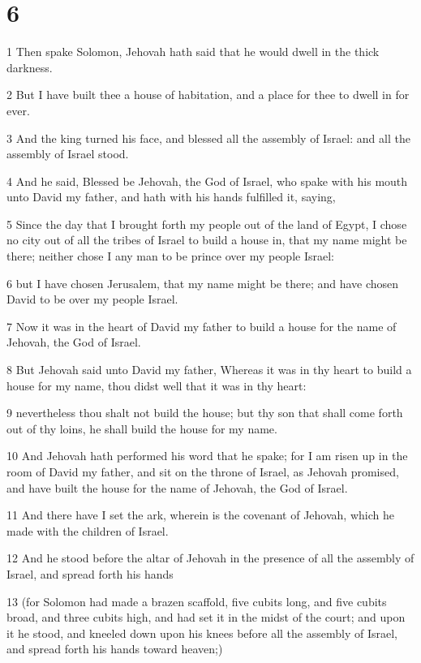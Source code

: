 \chapter{6}

\par 1 Then spake Solomon, Jehovah hath said that he would dwell in the thick darkness.
\par 2 But I have built thee a house of habitation, and a place for thee to dwell in for ever.
\par 3 And the king turned his face, and blessed all the assembly of Israel: and all the assembly of Israel stood.
\par 4 And he said, Blessed be Jehovah, the God of Israel, who spake with his mouth unto David my father, and hath with his hands fulfilled it, saying,
\par 5 Since the day that I brought forth my people out of the land of Egypt, I chose no city out of all the tribes of Israel to build a house in, that my name might be there; neither chose I any man to be prince over my people Israel:
\par 6 but I have chosen Jerusalem, that my name might be there; and have chosen David to be over my people Israel.
\par 7 Now it was in the heart of David my father to build a house for the name of Jehovah, the God of Israel.
\par 8 But Jehovah said unto David my father, Whereas it was in thy heart to build a house for my name, thou didst well that it was in thy heart:
\par 9 nevertheless thou shalt not build the house; but thy son that shall come forth out of thy loins, he shall build the house for my name.
\par 10 And Jehovah hath performed his word that he spake; for I am risen up in the room of David my father, and sit on the throne of Israel, as Jehovah promised, and have built the house for the name of Jehovah, the God of Israel.
\par 11 And there have I set the ark, wherein is the covenant of Jehovah, which he made with the children of Israel.
\par 12 And he stood before the altar of Jehovah in the presence of all the assembly of Israel, and spread forth his hands
\par 13 (for Solomon had made a brazen scaffold, five cubits long, and five cubits broad, and three cubits high, and had set it in the midst of the court; and upon it he stood, and kneeled down upon his knees before all the assembly of Israel, and spread forth his hands toward heaven;)
